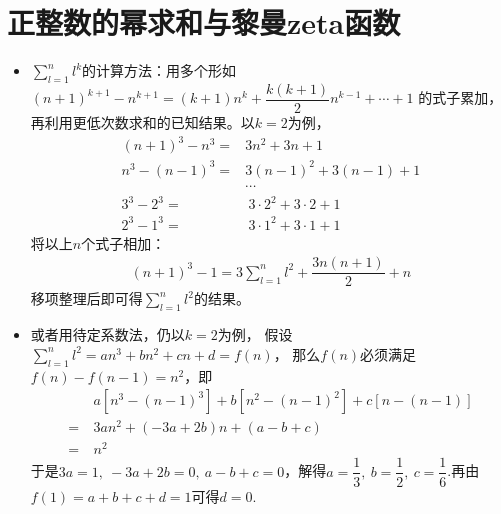 \section{正整数的幂求和与黎曼zeta函数}
\begin{itemize}[leftmargin=\inteval{\myitemleftmargin}pt,itemsep=
   \inteval{\myitemitempsep}pt,topsep=\inteval{\myitemtopsep}pt]
\item $ \sum\limits_{l=1}^{n} l^k $的计算方法：用多个形如
$ (n+1)^{k+1}-n^{k+1} =(k+1)n^k+\dfrac{k(k+1)}{2}n^{k-1}+\cdots +1 $
的式子累加，再利用更低次数求和的已知结果。以$ k=2 $为例，
\begin{align*}
    (n+1)^3-n^3 =&3n^2+3n+1 \\
    n^3-(n-1)^3 =&3(n-1)^2+3(n-1)+1 \\
    &\cdots \\
    3^3-2^3 =&\ 3\cdot 2^2+3\cdot 2 +1 \\    
    2^3-1^3 =&\ 3\cdot 1^2+3\cdot 1 +1    
\end{align*}
将以上$ n $个式子相加：
\begin{align*}
    (n+1)^3-1=3\sum_{l=1}^{n} l^2+\dfrac{3n(n+1)}{2}+n
\end{align*}
移项整理后即可得$ \sum\limits_{l=1}^{n} l^2 $的结果。
\item 或者用待定系数法，仍以$ k=2 $为例，
假设$ \sum\limits_{l=1}^{n} l^2=an^3+bn^2+cn+d=f(n) $，
那么$ f(n) $必须满足$ f(n)-f(n-1)=n^2 $，即
\begin{align*}
    &\ a[n^3-(n-1)^3]+b[n^2-(n-1)^2]+c[n-(n-1)] \\
    =&\ 3an^2+(-3a+2b)n+(a-b+c) \\
    =&\ n^2
\end{align*}
于是$ 3a=1,\ -3a+2b=0,\ a-b+c=0 $，解得$ a=\dfrac{1}{3},\ b=\dfrac{1}{2},\ c=
\dfrac{1}{6} $.再由$ f(1)=a+b+c+d=1 $可得$ d=0 $. 


\end{itemize}
